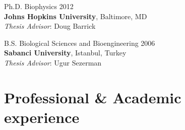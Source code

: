 \documentclass[12pt,letterpaper]{report}
\begin{document}
    \begin{tablist}

        \item[Ph.D.] \tab{}Biophysics \hfill 2012\\
        \textbf{Johns Hopkins University}, Baltimore, MD\\
        \textit{Thesis Advisor}: Doug Barrick 
        
        \item[B.S.]  \tab{}Biological Sciences and Bioengineering \hfill 2006\\
        \textbf{Sabanci University}, Istanbul, Turkey\\
        \textit{Thesis Advisor}: Ugur Sezerman

    \end{tablist}

    \section*{Professional \& Academic experience}
\end{document}
